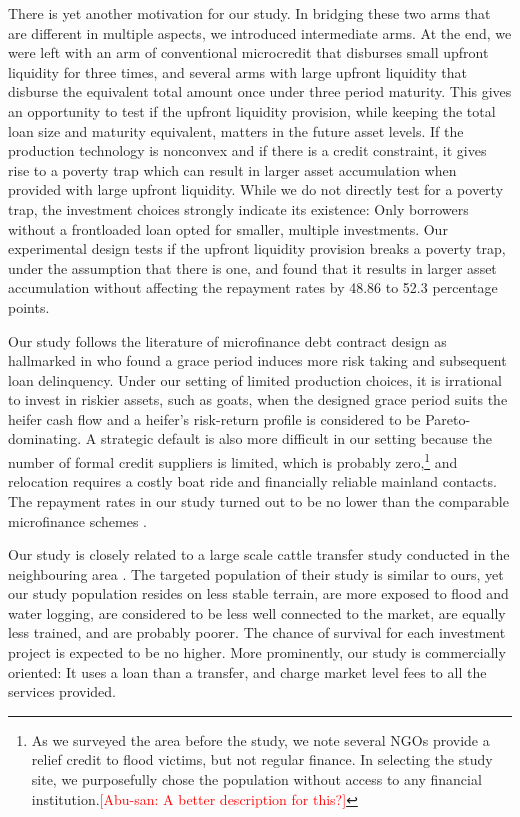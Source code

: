 	There is yet another motivation for our study. In bridging these two arms that are different in multiple aspects, we introduced intermediate arms. At the end, we were left with an arm of conventional microcredit that disburses small upfront liquidity for three times, and several arms with large upfront liquidity that disburse the equivalent total amount once under three period maturity. This gives an opportunity to test if the upfront liquidity provision, while keeping the total loan size and maturity equivalent, matters in the future asset levels. If the production technology is nonconvex and if there is a credit constraint, it gives rise to a poverty trap which can result in larger asset accumulation when provided with large upfront liquidity. While we do not directly test for a poverty trap, the investment choices strongly indicate its existence: Only borrowers without a frontloaded loan opted for smaller, multiple investments. Our experimental design tests if the upfront liquidity provision breaks a poverty trap, under the assumption that there is one, and found that it results in larger asset accumulation without affecting the repayment rates by 48.86 to 52.3 percentage points.

	Our study follows the literature of microfinance debt contract design as hallmarked in \citet{Field2013} who found a grace period induces more risk taking and subsequent loan delinquency. Under our setting of limited production choices, it is irrational to invest in riskier assets, such as goats, when the designed grace period suits the heifer cash flow and a heifer's risk-return profile is considered to be Pareto-dominating. A strategic default is also more difficult in our setting because the number of formal credit suppliers is limited, which is probably zero,\footnote{As we surveyed the area before the study, we note several NGOs provide a relief credit to flood victims, but not regular finance. In selecting the study site, we purposefully chose the population without access to any financial institution.\textcolor{red}{[Abu-san: A better description for this?]} } and relocation requires a costly boat ride and financially reliable mainland contacts. The repayment rates in our study turned out to be no lower than the comparable microfinance schemes \citep{BanerjeeKarlanZinman2015}.

	Our study is closely related to a large scale cattle transfer study conducted in the neighbouring area \citep{BandieraBRAC2017, Balboni2020}. The targeted population of their study is similar to ours, yet our study population resides on less stable terrain, are more exposed to flood and water logging, are considered to be less well connected to the market, are equally less trained, and are probably poorer. The chance of survival for each investment project is expected to be no higher. More prominently, our study is commercially oriented: It uses a loan than a transfer, and charge market level fees to all the services provided. 
	



